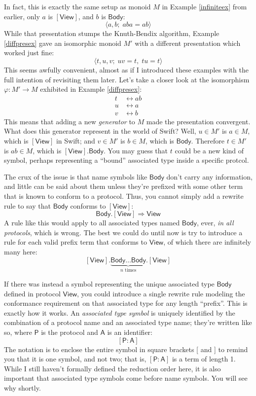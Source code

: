\documentclass[headsepline,bibliography=totoc]{scrreport}
\newcommand{\namesym}[1]{\mathsf{#1}}
\newcommand{\proto}[1]{\bm{\mathsf{#1}}}
\newcommand{\protosym}[1]{[\proto{#1}]}
\newcommand{\assocsym}[2]{[\proto{#1}\colon\namesym{#2}]}
\theoremstyle{definition}
\theoremstyle{definition}
\theoremstyle{definition}
\begin{document}
In fact, this is exactly the same setup as monoid $M$ in Example \ref{infiniteex} from earlier, only $a$ is $\protosym{View}$, and $b$ is $\namesym{Body}$:
\[\langle a, b;\;aba=ab \rangle\]
While that presentation stumps the Knuth-Bendix algorithm, Example \ref{diffpresex} gave an isomorphic monoid $M'$ with a different presentation which worked just fine:
\[\langle t, u, v;\;uv=t,\;tu=t\rangle\]
This seems awfully convenient, almost as if I introduced these examples with the full intention of revisiting them later. Let's take a closer look at the isomorphism $\varphi\colon M'\rightarrow M$ exhibited in Example \ref{diffpresex}:
\begin{align*}
t&\leftrightarrow ab\\
u&\leftrightarrow a\\
v&\leftrightarrow b
\end{align*}
This means that adding a new \emph{generator} to $M$ made the presentation convergent. What does this generator represent in the world of Swift? Well, $u\in M'$ is $a\in M$, which is $\protosym{View}$ in Swift; and $v\in M'$ is $b\in M$, which is $\namesym{Body}$. Therefore $t\in M'$ is $ab\in M$, which is $\protosym{View}.\namesym{Body}$. You may guess that $t$ could be a new kind of symbol, perhaps representing a ``bound'' associated type inside a specific protcol.

 The crux of the issue is that name symbols like $\namesym{Body}$ don't carry any information, and little can be said about them unless they're prefixed with some other term that is known to conform to a protocol. Thus, you cannot simply add a rewrite rule to say that $\namesym{Body}$ conforms to $\protosym{View}$:
\[\namesym{Body}.\protosym{View}\Rightarrow\namesym{View}\]
A rule like this would apply to all associated types named $\namesym{Body}$, ever, \emph{in all protocols}, which is wrong. The best we could do until now is try to introduce a rule for each valid prefix term that conforms to $\proto{View}$, of which there are infinitely many here:
\[\protosym{View}.\underbrace{\namesym{Body}\ldots\namesym{Body}}_{\textrm{$n$ times}}.\protosym{View}\]

If there was instead a symbol representing the unique associated type $\namesym{Body}$ defined in protocol $\proto{View}$, you could introduce a single rewrite rule modeling the conformance requirement on that associated type for any length ``prefix''. This is exactly how it works. An \emph{associated type symbol} is uniquely identified by the combination of a protocol name and an associated type name; they're written like so, where $\proto{P}$ is the protocol and $\namesym{A}$ is an identifier:
\[\assocsym{P}{A}\]
The notation is to enclose the entire symbol in square brackets [ and ] to remind you that it is one symbol, and not two; that is, $\assocsym{P}{A}$ is a term of length 1. While I still haven't formally defined the reduction order here, it is also important that associated type symbols come before name symbols. You will see why shortly.
\end{document}
